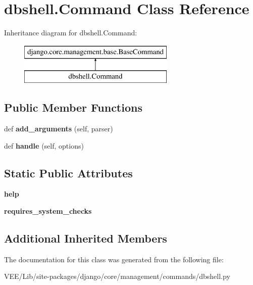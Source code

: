 \hypertarget{classdbshell_1_1_command}{}\section{dbshell.\+Command Class Reference}
\label{classdbshell_1_1_command}
Inheritance diagram for dbshell.\+Command\+:\begin{figure}[H]
\begin{center}
\leavevmode
\includegraphics[height=2.000000cm]{classdbshell_1_1_command}
\end{center}
\end{figure}
\subsection*{Public Member Functions}
\begin{DoxyCompactItemize}
\item 
\mbox{\label{classdbshell_1_1_command_a191a3d14b9b9cc826536dd85f4787fc2}} 
def {\bfseries add\+\_\+arguments} (self, parser)
\item 
\mbox{\label{classdbshell_1_1_command_af80f93e04699e42e1e2e6271f29d7d3c}} 
def {\bfseries handle} (self, options)
\end{DoxyCompactItemize}
\subsection*{Static Public Attributes}
\begin{DoxyCompactItemize}
\item 
\mbox{\label{classdbshell_1_1_command_a59ba0fe0098499b927e242f678ab0351}} 
{\bfseries help}
\item 
\mbox{\label{classdbshell_1_1_command_a369d337d6dbe66437a2945b598d07d9b}} 
{\bfseries requires\+\_\+system\+\_\+checks}
\end{DoxyCompactItemize}
\subsection*{Additional Inherited Members}


The documentation for this class was generated from the following file\+:\begin{DoxyCompactItemize}
\item 
V\+E\+E/\+Lib/site-\/packages/django/core/management/commands/dbshell.\+py\end{DoxyCompactItemize}
